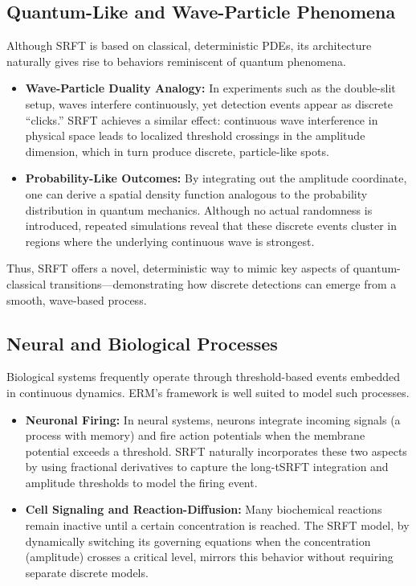 \documentclass[12pt]{article}
\begin{document}
\medskip

\subsection{Quantum-Like and Wave-Particle Phenomena}
Although SRFT is based on classical, deterministic PDEs, its architecture naturally gives rise to behaviors reminiscent of quantum phenomena.

\begin{itemize}
    \item \textbf{Wave-Particle Duality Analogy:}  
          In experiments such as the double-slit setup, waves interfere continuously, yet detection events appear as discrete “clicks.” SRFT achieves a similar effect: continuous wave interference in physical space leads to localized threshold crossings in the amplitude dimension, which in turn produce discrete, particle-like spots. 
    \item \textbf{Probability-Like Outcomes:}  
          By integrating out the amplitude coordinate, one can derive a spatial density function analogous to the probability distribution in quantum mechanics. Although no actual randomness is introduced, repeated simulations reveal that these discrete events cluster in regions where the underlying continuous wave is strongest.
\end{itemize}

\noindent
Thus, SRFT offers a novel, deterministic way to mimic key aspects of quantum-classical transitions—demonstrating how discrete detections can emerge from a smooth, wave-based process.

\medskip

\subsection{Neural and Biological Processes}
Biological systems frequently operate through threshold-based events embedded in continuous dynamics. ERM’s framework is well suited to model such processes.

\begin{itemize}
    \item \textbf{Neuronal Firing:}  
          In neural systems, neurons integrate incoming signals (a process with memory) and fire action potentials when the membrane potential exceeds a threshold. SRFT naturally incorporates these two aspects by using fractional derivatives to capture the long-tSRFT integration and amplitude thresholds to model the firing event.
    \item \textbf{Cell Signaling and Reaction-Diffusion:}  
          Many biochemical reactions remain inactive until a certain concentration is reached. The SRFT model, by dynamically switching its governing equations when the concentration (amplitude) crosses a critical level, mirrors this behavior without requiring separate discrete models.
\end{itemize}
\end{document}
